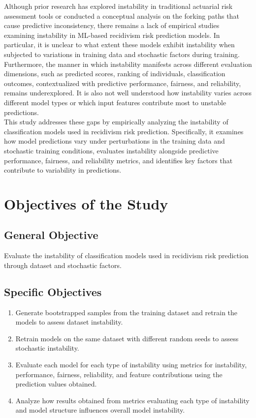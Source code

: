 \documentclass[12pt]{article}
\begin{document}
Although prior research has explored instability in traditional actuarial risk assessment tools or conducted a conceptual analysis on the forking paths that cause predictive inconsistency, there remains a lack of empirical studies examining instability in ML-based recidivism risk prediction models. In particular, it is unclear to what extent these models exhibit instability when subjected to variations in training data and stochastic factors during training. Furthermore, the manner in which instability manifests across different evaluation dimensions, such as predicted scores, ranking of individuals, classification outcomes, contextualized with predictive performance, fairness, and reliability, remains underexplored. It is also not well understood how instability varies across different model types or which input features contribute most to unstable predictions.\\

This study addresses these gaps by empirically analyzing the instability of classification models used in recidivism risk prediction. Specifically, it examines how model predictions vary under perturbations in the training data and stochastic training conditions, evaluates instability alongside predictive performance, fairness, and reliability metrics, and identifies key factors that contribute to variability in predictions.

\section{Objectives of the Study} 
\subsection{General Objective} Evaluate the instability of classification models used in recidivism risk prediction through dataset and stochastic factors.
\subsection{Specific Objectives}
\begin{enumerate}
 \item Generate bootstrapped samples from the training dataset and retrain the models to assess dataset instability.
 \item Retrain models on the same dataset with different random seeds to assess stochastic instability.
 \item Evaluate each model for each type of instability using metrics for instability, performance, fairness, reliability, and feature contributions using the prediction values obtained. 
 \item Analyze how results obtained from metrics evaluating each type of instability and model structure influences overall model instability. 
\end{enumerate}
\end{document}
